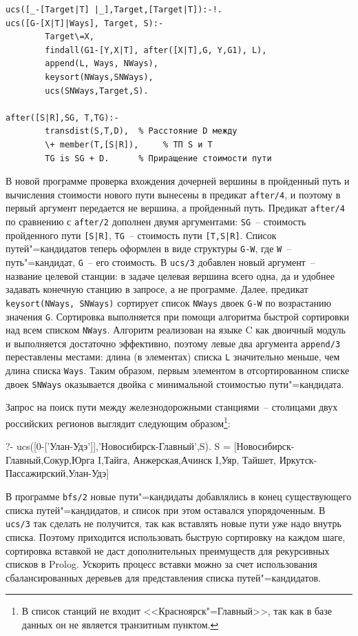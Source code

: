 \documentclass[a4paper,14pt, openany, twoside, draft]{extbook} %
\begin{document}
\begin{verbatim}
ucs([_-[Target|T] |_],Target,[Target|T]):-!.
ucs([G-[X|T]|Ways], Target, S):-
        Target\=X,
        findall(G1-[Y,X|T], after([X|T],G, Y,G1), L),
        append(L, Ways, NWays),
        keysort(NWays,SNWays),
        ucs(SNWays,Target,S).

after([S|R],SG, T,TG):-
        transdist(S,T,D),  % Расстояние D между
        \+ member(T,[S|R]),     % ТП S и T
        TG is SG + D.      % Приращение стоимости пути
\end{verbatim}


В новой программе проверка вхождения дочерней вершины в пройденный путь и вычисления стоимости нового пути вынесены в предикат \texttt{after/4}, и поэтому в первый аргумент передается не вершина, а пройденный путь.  Предикат \texttt{after/4} по сравнению с \texttt{after/2} дополнен двумя аргументами: \texttt{SG}~-- стоимость пройденного пути \texttt{[S|R]}, \texttt{TG}~-- стоимость пути \texttt{[T,S|R]}.  Список путей"=кандидатов теперь оформлен в виде структуры \texttt{G-W}, где \texttt{W}~-- путь"=кандидат, \texttt{G}~-- его стоимость.  В \texttt{ucs/3} добавлен новый аргумент~-- название целевой станции: в задаче целевая вершина всего одна, да и удобнее задавать конечную станцию в запросе, а не программе.  Далее, предикат \texttt{keysort(NWays, SNWays)} сортирует список \texttt{NWays} двоек \texttt{G-W} по возрастанию значения \texttt{G}.  Сортировка выполняется при помощи алгоритма быстрой сортировки над всем списком \texttt{NWays}.  Алгоритм реализован на языке C как двоичный модуль и выполняется достаточно эффективно, поэтому левые два аргумента \texttt{append/3} переставлены местами: длина (в элементах) списка \texttt{L} значительно меньше, чем длина списка \texttt{Ways}.  Таким образом, первым элементом в отсортированном списке двоек \texttt{SNWays} оказывается двойка с минимальной стоимостью пути"=кандидата.

Запрос на поиск пути между железнодорожными станциями~-- столицами двух российских регионов выглядит следующим образом\footnote{В список станций не входит <<Красноярск"=Главный>>, так как в базе данных он не является транзитным пунктом.}:

\begin{proexp}
?- ucs([0-['Улан-Удэ']],'Новосибирск-Главный',S).
S = [Новосибирск-Главный,Сокур,Юрга I,Тайга, Анжерская,Ачинск I,Уяр,
     Тайшет, Иркутск-Пассажирский,Улан-Удэ]
\end{proexp}


В программе \texttt{bfs/2} новые пути"=кандидаты добавлялись в конец существующего списка путей"=кандидатов, и список при этом оставался упорядоченным.  В \texttt{ucs/3} так сделать не получится, так как вставлять новые пути уже надо внутрь списка.  Поэтому приходится использовать быструю сортировку на каждом шаге, сортировка вставкой не даст дополнительных преимуществ для рекурсивных списков в Prolog.  Ускорить процесс вставки можно за счет использования сбалансированных деревьев для представления списка путей"=кандидатов.
\end{document}
